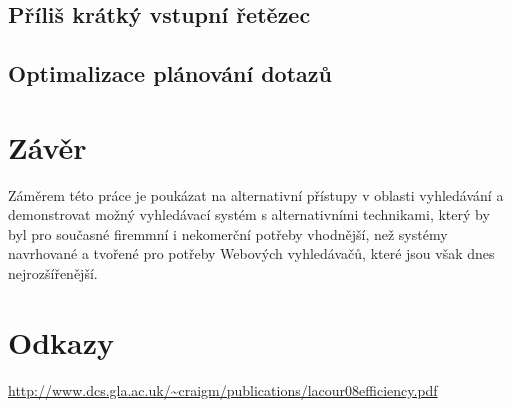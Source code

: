 \documentclass[11pt]{article}
\begin{document}
\subsection{Příliš krátký vstupní řetězec}
\subsection{Optimalizace plánování dotazů}


\section{Závěr}
Záměrem této práce je poukázat na alternativní přístupy v oblasti vyhledávání a
demonstrovat možný vyhledávací systém s alternativními technikami, který by byl
pro současné firemmní i nekomerční potřeby vhodnější, než systémy navrhované a
tvořené pro potřeby Webových vyhledávačů, které jsou však dnes nejrozšířenější.

\section{Odkazy}
\url{http://www.dcs.gla.ac.uk/~craigm/publications/lacour08efficiency.pdf}
\end{document}
